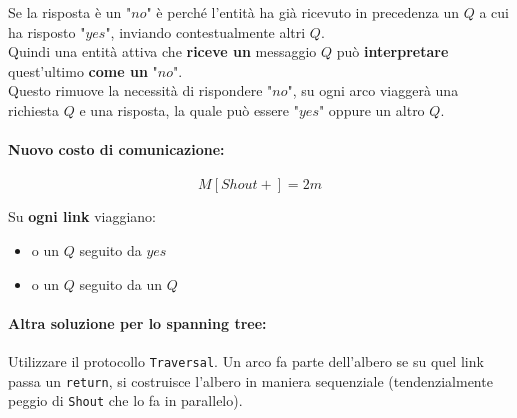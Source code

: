 Se la risposta è un "$no$" è perché l'entità ha già ricevuto in precedenza un $Q$ a cui ha risposto "$yes$", inviando contestualmente altri $Q$.\\

Quindi una entità attiva che \textbf{riceve un} messaggio $Q$ può \textbf{interpretare} quest'ultimo \textbf{come un} "$no$".\\

Questo rimuove la necessità di rispondere "$no$", su ogni arco viaggerà una richiesta $Q$ e una risposta, la quale può essere "$yes$" oppure un altro $Q$.\\

\paragraph{Nuovo costo di comunicazione:}
$$ M[Shout+] = 2m $$ 

Su \textbf{ogni link} viaggiano: 
\begin{itemize}
	\item o un $Q$ seguito da $yes$
	\item o un $Q$ seguito da un $Q$
\end{itemize}

\vfill 

\paragraph{Altra soluzione per lo spanning tree:} Utilizzare il protocollo \texttt{Traversal}. Un arco fa parte dell'albero se su quel link passa un \texttt{return}, si costruisce l'albero in maniera sequenziale (tendenzialmente peggio di \texttt{Shout} che lo fa in parallelo).\\

